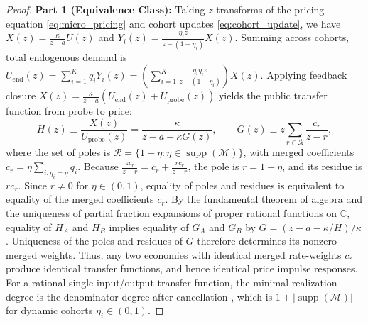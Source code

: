 \documentclass[12pt]{article}
\theoremstyle{definition}
\theoremstyle{remark}
\begin{document}
\begin{proof}
\textbf{Part 1 (Equivalence Class):} Taking $z$-transforms of the pricing equation \eqref{eq:micro_pricing} and cohort updates \eqref{eq:cohort_update}, we have $X(z) = \frac{\kappa}{z - a} U(z)$ and $Y_i(z) = \frac{\eta_i z}{z - (1 - \eta_i)} X(z)$. Summing across cohorts, total endogenous demand is $U_{\text{end}}(z) = \sum_{i=1}^K q_i Y_i(z) = \left( \sum_{i=1}^K \frac{q_i \eta_i z}{z - (1 - \eta_i)} \right) X(z)$. 
Applying feedback closure $X(z) = \frac{\kappa}{z - a} (U_{\text{end}}(z) + U_{\text{probe}}(z))$ yields the public transfer function from probe to price:
\begin{equation}
H(z) \equiv \frac{X(z)}{U_{\text{probe}}(z)} = \frac{\kappa}{z - a - \kappa G(z)}, \qquad G(z) \equiv z \sum_{r \in \mathcal{R}} \frac{c_r}{z - r},
\end{equation}
where the set of poles is $\mathcal{R} = \{1 - \eta : \eta \in \operatorname{supp}(\mathcal{M})\}$, with merged coefficients $c_r = \eta \sum_{i: \eta_i = \eta} q_i$. Because $\frac{z c_r}{z - r} = c_r + \frac{r c_r}{z - r}$, the pole is $r = 1 - \eta$, and its residue is $r c_r$. Since $r \neq 0$ for $\eta \in (0, 1)$, equality of poles and residues is equivalent to equality of the merged coefficients $c_r$. By the fundamental theorem of algebra and the uniqueness of partial fraction expansions of proper rational functions on $\mathbb{C}$, equality of $H_A$ and $H_B$ implies equality of $G_A$ and $G_B$ by $G=(z-a-\kappa/H)/\kappa$. Uniqueness of the poles and residues of $G$ therefore determines its nonzero merged weights. Thus, any two economies with identical merged rate-weights $c_r$ produce identical transfer functions, and hence identical price impulse responses. For a rational single-input/output transfer function, the minimal realization degree is the denominator degree after cancellation \citep{gilbert1963}, which is $1 + |\operatorname{supp}(\mathcal{M})|$ for dynamic cohorts $\eta_i \in (0, 1)$.


\end{proof}
\end{document}
